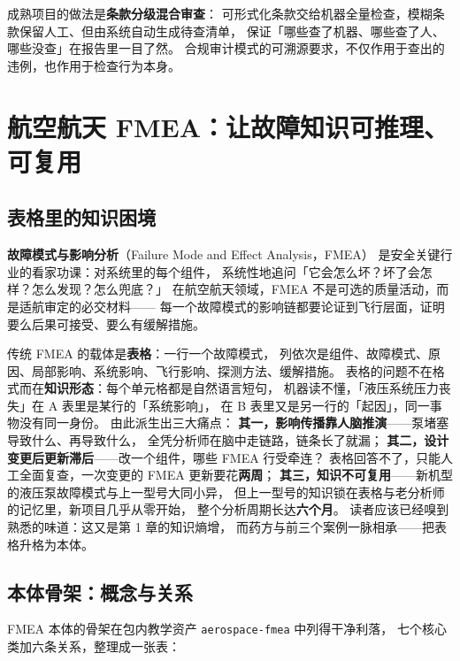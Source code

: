 成熟项目的做法是\textbf{条款分级混合审查}：
可形式化条款交给机器全量检查，模糊条款保留人工、但由系统自动生成待查清单，
保证「哪些查了机器、哪些查了人、哪些没查」在报告里一目了然。
合规审计模式的可溯源要求，不仅作用于查出的违例，也作用于检查行为本身。

\section{航空航天 FMEA：让故障知识可推理、可复用}

\subsection{表格里的知识困境}

\textbf{故障模式与影响分析}（Failure Mode and Effect Analysis，FMEA）
是安全关键行业的看家功课：对系统里的每个组件，
系统性地追问「它会怎么坏？坏了会怎样？怎么发现？怎么兜底？」
在航空航天领域，FMEA 不是可选的质量活动，而是适航审定的必交材料——
每一个故障模式的影响链都要论证到飞行层面，证明要么后果可接受、要么有缓解措施。

传统 FMEA 的载体是\textbf{表格}：一行一个故障模式，
列依次是组件、故障模式、原因、局部影响、系统影响、飞行影响、探测方法、缓解措施。
表格的问题不在格式而在\textbf{知识形态}：每个单元格都是自然语言短句，
机器读不懂，「液压系统压力丧失」在 A 表里是某行的「系统影响」，
在 B 表里又是另一行的「起因」，同一事物没有同一身份。
由此派生出三大痛点：
\textbf{其一，影响传播靠人脑推演}——泵堵塞导致什么、再导致什么，
全凭分析师在脑中走链路，链条长了就漏；
\textbf{其二，设计变更后更新滞后}——改一个组件，哪些 FMEA 行受牵连？
表格回答不了，只能人工全面复查，一次变更的 FMEA 更新要花\textbf{两周}；
\textbf{其三，知识不可复用}——新机型的液压泵故障模式与上一型号大同小异，
但上一型号的知识锁在表格与老分析师的记忆里，新项目几乎从零开始，
整个分析周期长达\textbf{六个月}。
读者应该已经嗅到熟悉的味道：这又是第 1 章的知识熵增，
而药方与前三个案例一脉相承——把表格升格为本体。

\subsection{本体骨架：概念与关系}

FMEA 本体的骨架在包内教学资产 \texttt{aerospace-fmea} 中列得干净利落，
七个核心类加六条关系，整理成一张表：

